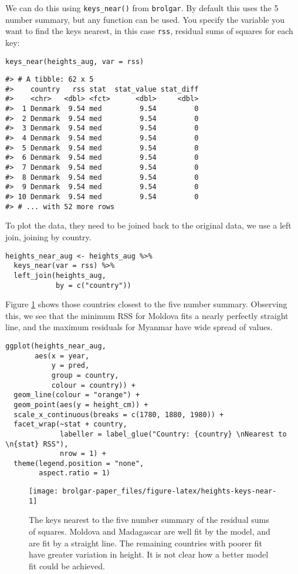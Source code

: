 We can do this using \texttt{keys\_near()} from \texttt{brolgar}. By default this uses the 5 number summary, but any function can be used. You specify the variable you want to find the keys nearest, in this case \texttt{rss}, residual sums of squares for each key:

\begin{verbatim}
keys_near(heights_aug, var = rss)
\end{verbatim}

\begin{verbatim}
#> # A tibble: 62 x 5
#>    country   rss stat  stat_value stat_diff
#>    <chr>   <dbl> <fct>      <dbl>     <dbl>
#>  1 Denmark  9.54 med         9.54         0
#>  2 Denmark  9.54 med         9.54         0
#>  3 Denmark  9.54 med         9.54         0
#>  4 Denmark  9.54 med         9.54         0
#>  5 Denmark  9.54 med         9.54         0
#>  6 Denmark  9.54 med         9.54         0
#>  7 Denmark  9.54 med         9.54         0
#>  8 Denmark  9.54 med         9.54         0
#>  9 Denmark  9.54 med         9.54         0
#> 10 Denmark  9.54 med         9.54         0
#> # ... with 52 more rows
\end{verbatim}

To plot the data, they need to be joined back to the original data, we use a left join, joining by country.

\begin{verbatim}
heights_near_aug <- heights_aug %>% 
  keys_near(var = rss) %>% 
  left_join(heights_aug, 
            by = c("country"))
\end{verbatim}

Figure \ref{fig:heights-keys-near} shows those countries closest to the five number summary. Observing this, we see that the minimum RSS for Moldova fits a nearly perfectly straight line, and the maximum residuals for Myanmar have wide spread of values.

\begin{verbatim}
ggplot(heights_near_aug,
       aes(x = year,
           y = pred,
           group = country,
           colour = country)) + 
  geom_line(colour = "orange") + 
  geom_point(aes(y = height_cm)) + 
  scale_x_continuous(breaks = c(1780, 1880, 1980)) +
  facet_wrap(~stat + country,
             labeller = label_glue("Country: {country} \nNearest to \n{stat} RSS"),
             nrow = 1) + 
  theme(legend.position = "none",
        aspect.ratio = 1)
\end{verbatim}

\begin{figure}

{\centering \texttt{[image: brolgar-paper\_files/figure-latex/heights-keys-near-1]} 

}

\caption{The keys nearest to the five number summary of the residual sums of squares. Moldova and Madagascar are well fit by the model, and are fit by a straight line. The remaining countries with poorer fit have greater variation in height. It is not clear how a better model fit could be achieved.}\label{fig:heights-keys-near}
\end{figure}

